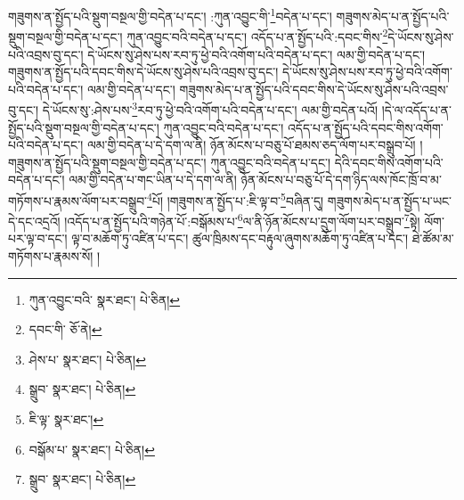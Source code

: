གཟུགས་ན་སྤྱོད་པའི་སྡུག་བསྔལ་གྱི་བདེན་པ་དང་། :ཀུན་འབྱུང་གི་\footnote{ཀུན་འབྱུང་བའི་  སྣར་ཐང་།  པེ་ཅིན། }བདེན་པ་དང་། གཟུགས་མེད་པ་ན་སྤྱོད་པའི་སྡུག་བསྔལ་གྱི་བདེན་པ་དང་། ཀུན་འབྱུང་བའི་བདེན་པ་དང་། འདོད་པ་ན་སྤྱོད་པའི་:དབང་གིས་\footnote{དབང་གི་  ཅོ་ནེ། }དེ་ཡོངས་སུ་ཤེས་པའི་འབྲས་བུ་དང་། དེ་ཡོངས་སུ་ཤེས་པས་རབ་ཏུ་ཕྱེ་བའི་འགོག་པའི་བདེན་པ་དང་། ལམ་གྱི་བདེན་པ་དང་། གཟུགས་ན་སྤྱོད་པའི་དབང་གིས་དེ་ཡོངས་སུ་ཤེས་པའི་འབྲས་བུ་དང་། དེ་ཡོངས་སུ་ཤེས་པས་རབ་ཏུ་ཕྱེ་བའི་འགོག་པའི་བདེན་པ་དང་། ལམ་གྱི་བདེན་པ་དང་། གཟུགས་མེད་པ་ན་སྤྱོད་པའི་དབང་གིས་དེ་ཡོངས་སུ་ཤེས་པའི་འབྲས་བུ་དང་། དེ་ཡོངས་སུ་:ཤེས་པས་\footnote{ཤེས་པ་  སྣར་ཐང་།  པེ་ཅིན། }རབ་ཏུ་ཕྱེ་བའི་འགོག་པའི་བདེན་པ་དང་། ལམ་གྱི་བདེན་པའོ། །དེ་ལ་འདོད་པ་ན་སྤྱོད་པའི་སྡུག་བསྔལ་གྱི་བདེན་པ་དང་། ཀུན་འབྱུང་བའི་བདེན་པ་དང་། འདོད་པ་ན་སྤྱོད་པའི་དབང་གིས་འགོག་པའི་བདེན་པ་དང་། ལམ་གྱི་བདེན་པ་དེ་དག་ལ་ནི། ཉོན་མོངས་པ་བཅུ་པོ་ཐམས་ཅད་ལོག་པར་བསྒྲུབ་པོ། །གཟུགས་ན་སྤྱོད་པའི་སྡུག་བསྔལ་གྱི་བདེན་པ་དང་། ཀུན་འབྱུང་བའི་བདེན་པ་དང་། དེའི་དབང་གིས་འགོག་པའི་བདེན་པ་དང་། ལམ་གྱི་བདེན་པ་གང་ཡིན་པ་དེ་དག་ལ་ནི། ཉོན་མོངས་པ་བཅུ་པོ་དེ་དག་ཉིད་ལས་ཁོང་ཁྲོ་བ་མ་གཏོགས་པ་རྣམས་ལོག་པར་བསྒྲུབ་\footnote{སྒྲུབ་  སྣར་ཐང་།  པེ་ཅིན། }པོ། །གཟུགས་ན་སྤྱོད་པ་:ཇི་ལྟ་བ་\footnote{ཇི་ལྟ་  སྣར་ཐང་། }བཞིན་དུ། གཟུགས་མེད་པ་ན་སྤྱོད་པ་ཡང་དེ་དང་འདྲའོ། །འདོད་པ་ན་སྤྱོད་པའི་གཉེན་པོ་:བསྒོམས་པ་\footnote{བསྒོམ་པ་  སྣར་ཐང་།  པེ་ཅིན། }ལ་ནི་ཉོན་མོངས་པ་དྲུག་ལོག་པར་བསྒྲུབ་\footnote{སྒྲུབ་  སྣར་ཐང་།  པེ་ཅིན། }སྟེ། ལོག་པར་ལྟ་བ་དང་། ལྟ་བ་མཆོག་ཏུ་འཛིན་པ་དང་། ཚུལ་ཁྲིམས་དང་བརྟུལ་ཞུགས་མཆོག་ཏུ་འཛིན་པ་དང་། ཐེ་ཚོམ་མ་གཏོགས་པ་རྣམས་སོ། །
